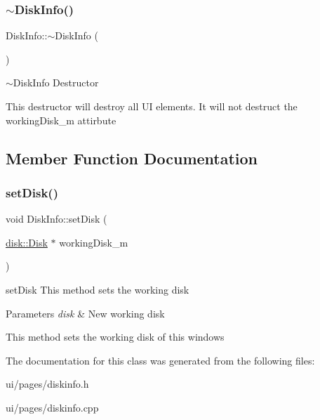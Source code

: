 \subsubsection{\texorpdfstring{$\sim$\+Disk\+Info()}{~DiskInfo()}}
{\footnotesize\ttfamily Disk\+Info\+::$\sim$\+Disk\+Info (\begin{DoxyParamCaption}{ }\end{DoxyParamCaption})}



$\sim$\+Disk\+Info Destructor 

This destructor will destroy all UI elements. It will not destruct the working\+Disk\+\_\+m attirbute 

\subsection{Member Function Documentation}
\mbox{\label{class_disk_info_ad139f5d545b7dc2f8b69cc51a126bfda}} 
\subsubsection{\texorpdfstring{set\+Disk()}{setDisk()}}
{\footnotesize\ttfamily void Disk\+Info\+::set\+Disk (\begin{DoxyParamCaption}\item[{\mbox{\hyperlink{classdisk_1_1_disk}{disk\+::\+Disk}} $\ast$}]{working\+Disk\+\_\+m }\end{DoxyParamCaption})}



set\+Disk This method sets the working disk 


\begin{DoxyParams}{Parameters}
{\em disk} & New working disk\\
\hline
\end{DoxyParams}
This method sets the working disk of this windows 

The documentation for this class was generated from the following files\+:\begin{DoxyCompactItemize}
\item 
ui/pages/diskinfo.\+h\item 
ui/pages/diskinfo.\+cpp\end{DoxyCompactItemize}
